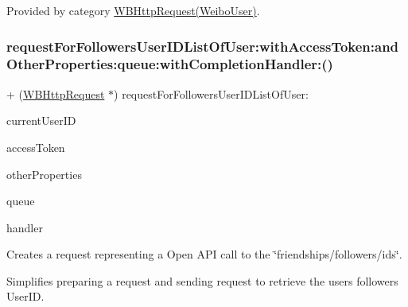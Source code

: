 Provided by category \mbox{\hyperlink{category_w_b_http_request_07_weibo_user_08_a0437dae63fa8fe40c7c5b323b45e0094}{W\+B\+Http\+Request(\+Weibo\+User)}}.

\mbox{\label{interface_w_b_http_request_a62303f19ac35267cff108384061f1de7}} 
\subsubsection{\texorpdfstring{request\+For\+Followers\+User\+I\+D\+List\+Of\+User\+:with\+Access\+Token\+:and\+Other\+Properties\+:queue\+:with\+Completion\+Handler\+:()}{requestForFollowersUserIDListOfUser:withAccessToken:andOtherProperties:queue:withCompletionHandler:()}\hspace{0.1cm}{\footnotesize\ttfamily [1/3]}}
{\footnotesize\ttfamily + (\mbox{\hyperlink{interface_w_b_http_request}{W\+B\+Http\+Request}} $\ast$) request\+For\+Followers\+User\+I\+D\+List\+Of\+User\+: \begin{DoxyParamCaption}\item[{(N\+S\+String $\ast$)}]{current\+User\+ID }\item[{withAccessToken:(N\+S\+String $\ast$)}]{access\+Token }\item[{andOtherProperties:(N\+S\+Dictionary $\ast$)}]{other\+Properties }\item[{queue:(N\+S\+Operation\+Queue $\ast$)}]{queue }\item[{withCompletionHandler:(W\+B\+Request\+Handler)}]{handler }\end{DoxyParamCaption}}

Creates a request representing a Open A\+PI call to the \char`\"{}friendships/followers/ids\char`\"{}.

Simplifies preparing a request and sending request to retrieve the user\textquotesingle{}s followers\textquotesingle{} User\+ID.

